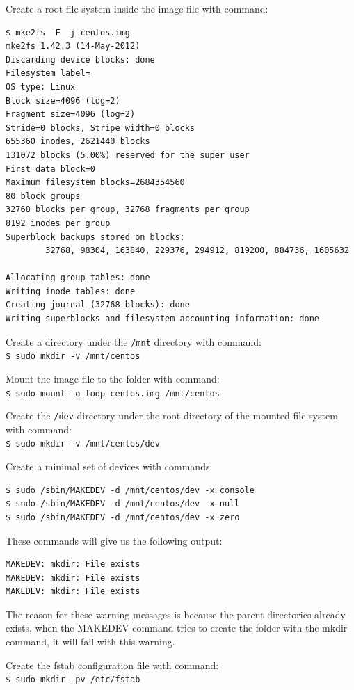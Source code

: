 Create a root file system inside the image file with command: 
\lstset{style=bashstyle}
\begin{lstlisting}
$ mke2fs -F -j centos.img
mke2fs 1.42.3 (14-May-2012)
Discarding device blocks: done
Filesystem label=
OS type: Linux
Block size=4096 (log=2)
Fragment size=4096 (log=2)
Stride=0 blocks, Stripe width=0 blocks
655360 inodes, 2621440 blocks
131072 blocks (5.00%) reserved for the super user
First data block=0
Maximum filesystem blocks=2684354560
80 block groups
32768 blocks per group, 32768 fragments per group
8192 inodes per group
Superblock backups stored on blocks:
        32768, 98304, 163840, 229376, 294912, 819200, 884736, 1605632

Allocating group tables: done
Writing inode tables: done
Creating journal (32768 blocks): done
Writing superblocks and filesystem accounting information: done
\end{lstlisting}

Create a directory under the \verb|/mnt| directory with command: \\
\verb|$ sudo mkdir -v /mnt/centos|

Mount the image file to the folder with command: \\
\verb|$ sudo mount -o loop centos.img /mnt/centos|

Create the \verb|/dev| directory under the root directory of the mounted file system with command: \\
\verb|$ sudo mkdir -v /mnt/centos/dev|

Create a minimal set of devices with commands:
\lstset{style=bashstyle}
\begin{lstlisting}
$ sudo /sbin/MAKEDEV -d /mnt/centos/dev -x console
$ sudo /sbin/MAKEDEV -d /mnt/centos/dev -x null
$ sudo /sbin/MAKEDEV -d /mnt/centos/dev -x zero
\end{lstlisting}
These commands will give us the following output:
\lstset{style=bashstyle}
\begin{lstlisting}
MAKEDEV: mkdir: File exists
MAKEDEV: mkdir: File exists
MAKEDEV: mkdir: File exists
\end{lstlisting}

The reason for these warning messages is because the parent directories already exists, when the MAKEDEV command tries to create the folder with the mkdir command, it will fail with this warning.

Create the fstab configuration file with command: \\
\verb|$ sudo mkdir -pv /etc/fstab|

